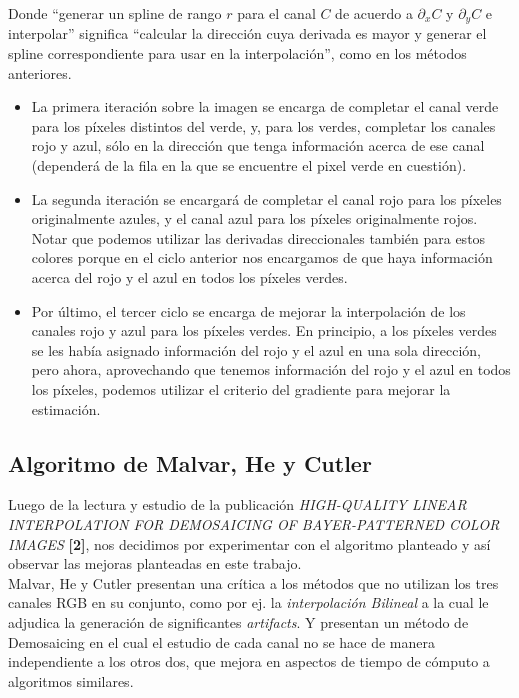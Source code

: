 \documentclass[a4paper]{article}
\begin{document}
Donde ``generar un spline de rango $r$ para el canal $C$ de acuerdo a \(\partial_xC\) y \(\partial_yC\) e interpolar'' significa ``calcular la dirección cuya derivada es mayor y generar el spline correspondiente para usar en la interpolación'', como en los métodos anteriores.

\begin{itemize}
\item La primera iteración sobre la imagen se encarga de completar el canal verde para los píxeles distintos del verde, y, para los verdes, completar los canales rojo y azul, sólo en la dirección que tenga información acerca de ese canal (dependerá de la fila en la que se encuentre el pixel verde en cuestión).
\item La segunda iteración se encargará de completar el canal rojo para los píxeles originalmente azules, y el canal azul para los píxeles originalmente rojos. Notar que podemos utilizar las derivadas direccionales también para estos colores porque en el ciclo anterior nos encargamos de que haya información acerca del rojo y el azul en todos los píxeles verdes.
\item Por último, el tercer ciclo se encarga de mejorar la interpolación de los canales rojo y azul para los píxeles verdes. En principio, a los píxeles verdes se les había asignado información del rojo y el azul en una sola dirección, pero ahora, aprovechando que tenemos información del rojo y el azul en todos los píxeles, podemos utilizar el criterio del gradiente para mejorar la estimación.
\end{itemize}



\newpage
\subsection{Algoritmo de Malvar, He y Cutler}

Luego de la lectura y estudio de la publicaci\'on \textit{HIGH-QUALITY LINEAR INTERPOLATION
FOR DEMOSAICING OF BAYER-PATTERNED COLOR IMAGES} \textbf{[2]}, nos decidimos por experimentar con el algoritmo planteado y as\'i observar las mejoras planteadas en este trabajo.\\

Malvar, He y Cutler presentan una cr\'itica a los m\'etodos que no utilizan los tres canales RGB en su conjunto, como por ej. la \emph{interpolaci\'on Bilineal} a la cual le adjudica la generaci\'on de significantes \textit{artifacts}. Y presentan un m\'etodo de Demosaicing en el cual el estudio de cada canal no se hace de manera independiente a los otros dos, que mejora en aspectos de tiempo de c\'omputo a algoritmos similares.\\
\end{document}
